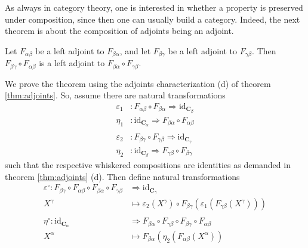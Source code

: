 As always in category theory, one is interested in whether a property is preserved under composition, since then one can usually build a category.
Indeed, the next theorem is about the composition of adjoints being an adjoint.
\\
\begin{thm}
\label{thm:adjointcomp}
Let $F_{\alpha\beta}$ be a left adjoint to $F_{\beta\alpha}$, and let $F_{\beta\gamma}$ be a left adjoint to $F_{\gamma\beta}$.
Then $F_{\beta\gamma} \circ F_{\alpha\beta}$ is a left adjoint to $F_{\beta\alpha} \circ F_{\gamma\beta}$.
\end{thm}
\begin{prf}
We prove the theorem using the adjoints characterization (d) of theorem \ref{thm:adjoints}.
So, assume there are natural transformations
\begin{align*}
  \varepsilon_{1}
  &\colon
  F_{\alpha\beta}
  \circ
  F_{\beta\alpha}
  \Rightarrow
  \mathrm{id}_{\mathbf{C}_{\beta}}
  \\
  \eta_{1}
  &\colon
  \mathrm{id}_{\mathbf{C}_{\alpha}}
  \Rightarrow
  F_{\beta\alpha}
  \circ
  F_{\alpha\beta}
  \\\\
  \varepsilon_{2}
  &\colon
  F_{\beta\gamma}
  \circ
  F_{\gamma\beta}
  \Rightarrow
  \mathrm{id}_{\mathbf{C}_{\gamma}}
  \\
  \eta_{2}
  &\colon
  \mathrm{id}_{\mathbf{C}_{\beta}}
  \Rightarrow
  F_{\gamma\beta}
  \circ
  F_{\beta\gamma}
\end{align*}
such that the respective whiskered compositions are identities as demanded in theorem \ref{thm:adjoints} (d).
Then define natural transformations
\begin{align*}
  \varepsilon^{\circ}
  \colon
  F_{\beta\gamma}
  \circ
  F_{\alpha\beta}
  \circ
  F_{\beta\alpha}
  \circ
  F_{\gamma\beta}
  &\Rightarrow
  \mathrm{id}_{\mathbf{C}_{\gamma}}
  \\
  X^{\gamma}
  &\mapsto
  \varepsilon_{2}(X^{\gamma})
  \circ
  F_{\beta\gamma}
  \left(
    \varepsilon_{1}
    \left(
      F_{\gamma\beta}(X^{\gamma})
    \right)
  \right)
  \\\\
  \eta^{\circ}
  \colon
  \mathrm{id}_{\mathbf{C}_{\alpha}}
  &\Rightarrow
  F_{\beta\alpha}
  \circ
  F_{\gamma\beta}
  \circ
  F_{\beta\gamma}
  \circ
  F_{\alpha\beta}
  \\
  X^{\alpha}
  &\mapsto
  F_{\beta\alpha}
  \left(
    \eta_{2}
    \left(
      F_{\alpha\beta}(X^{\alpha})
    \right)

\end{align*}
\end{prf}
